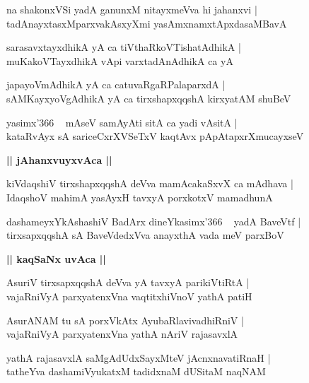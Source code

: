 \documentclass[twoside,12pt,openright]{book}
\newcounter{shloka}[chapter]
\def\uvaca#1{\centerline{{\large\textbf{#1}}}}
\begin{document}
\begin{shloka}%
na shakonxVSi yadA ganunxM nitayxmeVva hi jahanxvi |\\
tadAnayxtasxMparxvakAsxyXmi yasAmxnamxtApxdasaMBavA
\end{shloka}

\begin{shloka}%
sarasavxtayxdhikA yA ca tiVthaRkoVTishatAdhikA |\\
muKakoVTayxdhikA vApi varxtadAnAdhikA ca yA
\end{shloka}

\begin{shloka}%
japayoVmAdhikA yA ca catuvaRgaRPalaparxdA |\\
sAMKayxyoVgAdhikA yA ca tirxshapxqqshA kirxyatAM shuBeV 
\end{shloka}

\begin{shloka}%
yasimx\char'366 ~ mAseV samAyAti sitA ca yadi vAsitA |\\
kataRvAyx sA sariceCxrXVSeTxV kaqtAvx pApAtapxrXmucayxseV
\end{shloka}

\uvaca{|| jAhanxvuyxvAca ||}

\begin{shloka}%
kiVdaqshiV tirxshapxqqshA deVva mamAcakaSxvX ca mAdhava |\\
IdaqshoV mahimA yasAyxH tavxyA porxkotxV mamadhunA
\end{shloka}

\begin{shloka}%
dashameyxYkAshashiV BadArx dineYkasimx\char'366 ~ yadA BaveVtf |\\
tirxsapxqqshA sA BaveVdedxVva anayxthA vada meV parxBoV
\end{shloka}

\uvaca{|| kaqSaNx uvAca ||}

\begin{shloka}%
AsuriV tirxsapxqqshA deVva yA tavxyA parikiVtiRtA |\\
vajaRniVyA parxyatenxVna vaqtitxhiVnoV yathA patiH 
\end{shloka}

\begin{shloka}%
AsurANAM tu sA porxVkAtx AyubaRlavivadhiRniV |\\
vajaRniVyA parxyatenxVna yathA nAriV rajasavxlA
\end{shloka}

\begin{shloka}%
yathA rajasavxlA saMgAdUdxSayxMteV jAcnxnavatiRnaH |\\
tatheYva dashamiVyukatxM tadidxnaM dUSitaM naqNAM 
\end{shloka}
\end{document}
